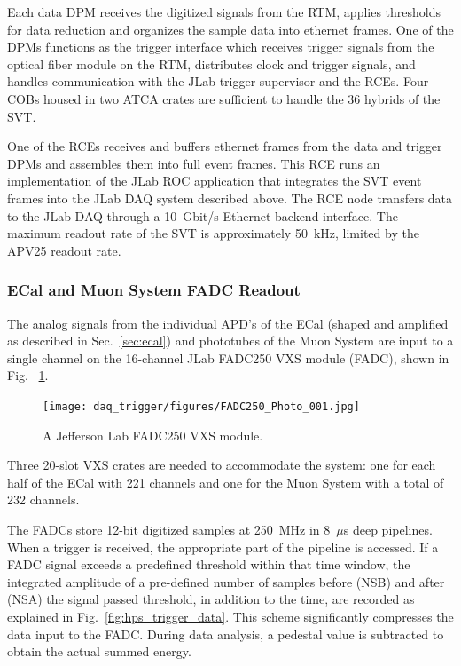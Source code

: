 Each data DPM receives the digitized signals 
from the RTM, applies thresholds for data reduction and organizes the sample data 
into ethernet frames. One of the DPMs functions as the trigger interface which receives trigger 
signals from the optical fiber module on the RTM, distributes clock and trigger signals, 
and handles communication with the JLab trigger supervisor and the RCEs. Four COBs housed in two 
ATCA crates are sufficient to handle the 36 hybrids of the SVT.

One of the RCEs receives and buffers ethernet 
frames from the data and trigger DPMs and assembles them into full event frames. This RCE 
runs an implementation of the JLab ROC application that integrates the SVT event frames into the JLab 
DAQ system described above. The RCE node transfers data to the JLab DAQ  
 through a 10~Gbit/s Ethernet backend interface. The maximum readout rate of the SVT is approximately 50~kHz, limited by the APV25 readout rate. 










\subsubsection{ECal and Muon System FADC Readout}
\label{sec:fadc_daq}
The analog signals from the individual APD's of the ECal (shaped and amplified as described in Sec.~\ref{sec:ecal}) and phototubes of the Muon System are input to a single channel on the 16-channel JLab FADC250 VXS module (FADC), shown in Fig. ~\ref{fig:fadc}. 
\begin{figure}[t]
\texttt{[image: daq\_trigger/figures/FADC250\_Photo\_001.jpg]}
\caption{\small{A Jefferson Lab FADC250 VXS module.}}
\label{fig:fadc}
\end{figure}

Three 20-slot VXS crates are needed to accommodate the system: one for each half of the ECal with 221 channels and one for the Muon System with a total of 232 channels. 

The FADCs store 12-bit digitized samples at 250~MHz in 8~$\mu$s deep pipelines. 
When a trigger is received, the appropriate part of the pipeline is accessed. If a FADC   
signal exceeds a predefined threshold within that time window, the integrated amplitude of a pre-defined number of samples before (NSB) and after (NSA) the signal passed threshold, in addition to the time, are recorded as explained in Fig.~\ref{fig:hps_trigger_data}. This scheme significantly compresses the data input to the FADC. During data analysis, a pedestal value is subtracted to obtain the actual summed energy.

